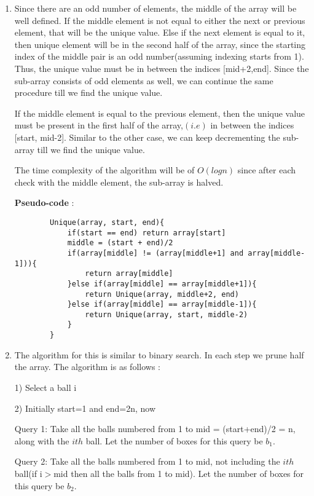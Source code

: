 \documentclass[12pt]{article}
\begin{document}
\begin{enumerate}
\begin{enumerate}
    \end{enumerate}
    \item
    Since there are an odd number of elements, the middle of the array will be well defined. If the middle element is not equal to either the next or previous element, that will be the unique value. Else if the next element is equal to it, then unique element will be in the second half of the array, since the starting index of the middle pair is an odd number(assuming indexing starts from 1). Thus, the unique value must be in between the indices [mid+2,end]. Since the sub-array consists of odd elements as well, we can continue the same procedure till we find the unique value.
    
    If the middle element is equal to the previous element, then the unique value must be present in the first half of the array,$(i.e)$ in between the indices [start, mid-2]. Similar to the other case, we can keep decrementing the sub-array till we find the unique value.
    
    The time complexity of the algorithm will be of $O(logn)$ since after each check with the middle element, the sub-array is halved.
    
    \textbf{Pseudo-code} :
    \begin{verbatim}
        Unique(array, start, end){
            if(start == end) return array[start]
            middle = (start + end)/2
            if(array[middle] != (array[middle+1] and array[middle-1])){
                return array[middle]
            }else if(array[middle] == array[middle+1]){
                return Unique(array, middle+2, end)
            }else if(array[middle] == array[middle-1]){
                return Unique(array, start, middle-2)
            }
        }
    \end{verbatim}
    \item %
    The algorithm for this is similar to binary search. In each step we prune half the array. The algorithm is as follows :
    
    1) Select a ball i 
    
    2) Initially start=1 and end=2n, now 
    
    Query 1: Take all the balls numbered from 1 to mid = (start+end)/2 = n, along with the $ith$ ball. Let the number of boxes for this query be $b_1$.  
    
    Query 2: Take all the balls numbered from 1 to mid, not including the $ith$ ball(if i$>$mid then all the balls from 1 to mid). Let the number of boxes for this query be $b_2$.
    

\end{enumerate}
\end{document}
